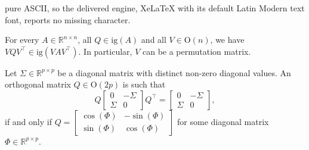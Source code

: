\documentclass[10pt,a4paper]{amsart}
\begin{document}
pure ASCII, so the delivered engine, XeLaTeX with its default Latin Modern text font, reports no missing character.
\begin{lemma}\label{lem:permute}

	For every $A\in\mathbb{R}^{n\times n}$, all $Q\in\mathrm{ig}(A)$ and all $V\in\mathrm{O}(n)$, we have $VQV^\top \in\mathrm{ig}(VAV^\top )$. In particular, $V$ can be a permutation matrix.
	\end{lemma}

	\begin{lemma}
	\label{lem:Invariance_lambda}
		Let $\Sigma\in\mathbb{R}^{p\times p}$ be a diagonal matrix with distinct non-zero diagonal values. An orthogonal matrix $Q\in\mathrm{O}(2p)$ is such that
		\begin{equation}\label{eq:invariance_sigma}
			Q\begin{bmatrix}
			0&-\Sigma\\
			\Sigma& 0
			\end{bmatrix}Q^\top  = \begin{bmatrix}
			0&-\Sigma\\
			\Sigma& 0
			\end{bmatrix},
		\end{equation}
		if and only if $Q = \begin{bmatrix}
		\cos(\Phi)&-\sin(\Phi)\\
		\sin(\Phi)&\cos(\Phi)
		\end{bmatrix}$ for some diagonal matrix $\Phi\in\mathbb{R}^{p\times p}$.
	\end{lemma}
\end{document}
